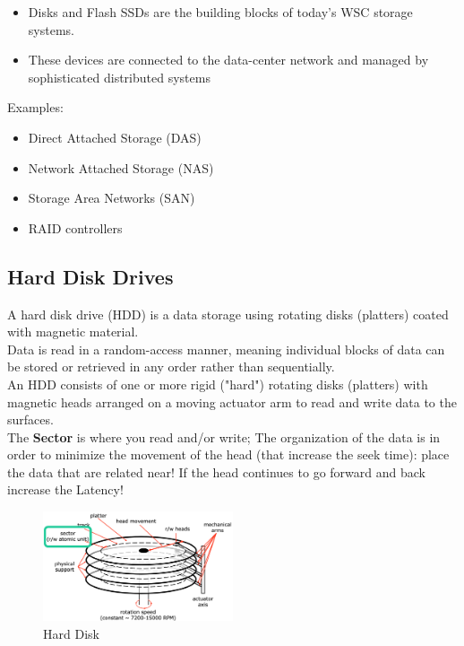 \documentclass[10pt, oneside]{article}
\begin{document}
\begin{itemize}
        \item Disks and Flash SSDs are the building blocks of today’s WSC storage systems.
        \item These devices are connected to the data-center network and managed by sophisticated distributed systems
    \end{itemize} 
Examples: 
\begin{itemize}
    \item Direct Attached Storage (DAS)
    \item Network Attached Storage (NAS)
    \item Storage Area Networks (SAN)
    \item RAID controllers
\end{itemize}

\subsection{Hard Disk Drives}
\begin{multicols}{2}
A hard disk drive (HDD) is a data storage using rotating disks (platters) coated with magnetic material.\\
Data is read in a random-access manner, meaning individual blocks of data can be stored or retrieved in any order rather than sequentially.\\
An HDD consists of one or more rigid ("hard") rotating disks (platters) with magnetic heads arranged on a moving actuator arm to read and write data to the surfaces.\\
The {\bf Sector} is where you read and/or write; The organization of the data is in order to minimize the movement of the head (that increase the seek time): place the data that are related near! If the head continues to go forward and back increase the Latency!
\columnbreak
\begin{figure}[H]
    \begin{center}
    \includegraphics[width=0.5\textwidth]{img/img12.png}
    \caption{Hard Disk}
    \label{fig:HDD}
    \end{center}
\end{figure}
\end{multicols}
\end{document}
